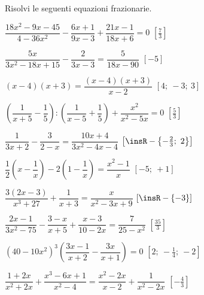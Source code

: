 \begin{esercizio}[\Ast]
\label{ese:20.28}
Risolvi le seguenti equazioni frazionarie.
\begin{enumeratea}
 \item $\dfrac{18x^{2}-9x-45}{4-36x^{2}}-\dfrac{6x+1}{9x-3}+
        \dfrac{21x-1}{18x+6}=0$ \hfill $\left[\frac{7}{3}\right]$
 \item $\dfrac{5x}{3x^{2}-18x+15}-\dfrac{2}{3x-3}=\dfrac{5}{18x-90}$
  \hfill $\left[-5\right]$
 \item $(x-4)(x+3)=\dfrac{(x-4)(x+3)}{x-2}$
  \hfill $\left[4;~-3;~3\right]$
 \item $\left(\dfrac{1}{x+5}-\dfrac{1}{5}\right):\left(\dfrac{1}{x-5}+
        \dfrac{1}{5}\right)+\dfrac{x^{2}}{x^{2}-5x}=0$
  \hfill $\left[\frac{5}{3}\right]$
 \item $\dfrac{1}{3x+2}-\dfrac{3}{2-x}=\dfrac{10x+4}{3x^{2}-4x-4}$
  \hfill $\left[\insR-\left\{-{\frac{2}{3}};~2\right\}\right]$
 \item $\dfrac{1}{2} \left(x-\dfrac{1}{x}\right)-
        2\left(1-\dfrac{1}{x}\right)=\dfrac{x^{2}-1}{x}$
  \hfill $\left[-5;~+1\right]$
 \item $\dfrac{3(2x-3)}{x^{3}+27}+\dfrac{1}{x+3}=\dfrac{x}{x^{2}-3x+9}$
  \hfill $\left[\insR-\{-3\}\right]$
 \item $\dfrac{2x-1}{3x^{2}-75}-\dfrac{3-x}{x+5}+\dfrac{x-3}{10-2x}=
        \dfrac{7}{25-x^{2}}$
  \hfill $\left[\frac{35}{3}\right]$
 \item $\left(40-10x^{2}\right)^{3} \left(\dfrac{3x-1}{x+2}-
        \dfrac{3x}{x+1}\right)=0$
  \hfill $\left[2;~-\frac{1}{4};~-2\right]$
 \item $\dfrac{1+2x}{x^{2}+2x}+\dfrac{x^{3}-6x+1}{x^{2}-4}=
        \dfrac{x^{2}-2x}{x-2}+\dfrac{1}{x^{2}-2x}$
  \hfill $\left[-\frac{4}{3}\right]$
\end{enumeratea}
\end{esercizio}

